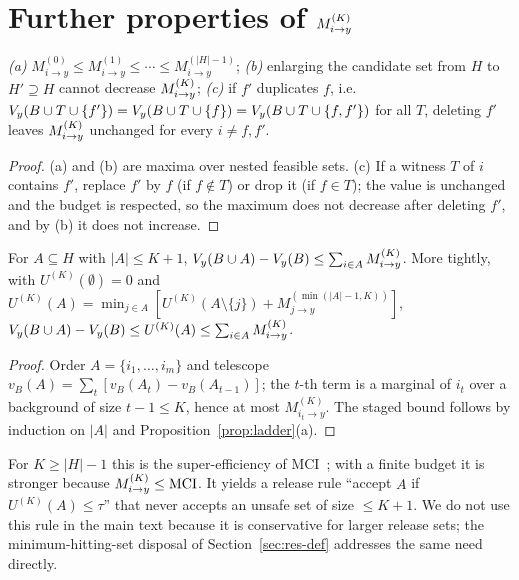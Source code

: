 \section{Further properties of $M^{(K)}_{i \to y}$}\label{app:proofs}

\begin{proposition}\label{prop:ladder}
\emph{(a)} $M^{(0)}_{i\to y}\le M^{(1)}_{i\to y}\le\cdots\le M^{(|H|-1)}_{i\to y}$;
\emph{(b)} enlarging the candidate set from $H$ to $H'\supseteq H$ cannot decrease $M^{(K)}_{i \to y}$;
\emph{(c)} if $f'$ duplicates $f$, i.e.\ $V_{y}(B\cup T\cup\{f'\})=V_{y}(B\cup T\cup\{f\})=V_{y}(B\cup T\cup\{f,f'\})$
for all $T$, deleting $f'$ leaves $M^{(K)}_{i \to y}$ unchanged for every $i\ne f,f'$.
\end{proposition}
\begin{proof}
(a) and (b) are maxima over nested feasible sets. (c) If a witness $T$ of $i$ contains $f'$,
replace $f'$ by $f$ (if $f\notin T$) or drop it (if $f\in T$); the value is unchanged and the budget
is respected, so the maximum does not decrease after deleting $f'$, and by (b) it does not increase.
\end{proof}

\begin{theorem}\label{thm:super}
For $A\subseteq H$ with $|A|\le K+1$, $V_{y}(B\cup A)-V_{y}(B)\le\sum_{i\in A}M^{(K)}_{i \to y}$. More tightly, with
$U^{(K)}(\emptyset)=0$ and $U^{(K)}(A)=\min_{j\in A}[U^{(K)}(A\setminus\{j\})+M^{(\min(|A|-1,K))}_{j\to y}]$,
$V_{y}(B\cup A)-V_{y}(B)\le U^{(K)}(A)\le\sum_{i\in A}M^{(K)}_{i \to y}$.
\end{theorem}
\begin{proof}
Order $A=\{i_1,\dots,i_m\}$ and telescope $v_B(A)=\sum_t[v_B(A_t)-v_B(A_{t-1})]$; the $t$-th term is a
marginal of $i_t$ over a background of size $t-1\le K$, hence at most $M^{(K)}_{i_t\to y}$. The staged
bound follows by induction on $|A|$ and Proposition~\ref{prop:ladder}(a).
\end{proof}
For $K\ge|H|-1$ this is the super-efficiency of MCI~\cite{catav2021mci}; with a finite budget it is
stronger because $M^{(K)}_{i \to y}\le\mathrm{MCI}$. It yields a release rule ``accept $A$ if $U^{(K)}(A)\le\tau$''
that never accepts an unsafe set of size $\le K+1$. We do not use this rule in the main text because
it is conservative for larger release sets; the minimum-hitting-set disposal of
Section~\ref{sec:res-def} addresses the same need directly.


